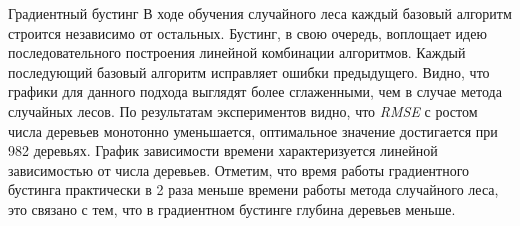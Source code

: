 \documentclass[12pt]{article}
\begin{document}
\begin{section}{Градиентный бустинг}
В ходе обучения случайного леса каждый базовый алгоритм строится независимо от остальных. Бустинг, в свою очередь, воплощает идею последовательного построения линейной комбинации алгоритмов. Каждый последующий базовый алгоритм исправляет ошибки предыдущего. Видно, что графики для данного подхода выглядят более сглаженными, чем в случае метода случайных лесов. По результатам экспериментов видно, что \emph{RMSE} с ростом числа деревьев монотонно уменьшается, оптимальное значение достигается при 982 деревьях. График зависимости времени характеризуется линейной зависимостью от числа деревьев. Отметим, что время работы градиентного бустинга практически в 2 раза меньше времени работы метода случайного леса, это связано с тем, что в градиентном бустинге глубина деревьев меньше. 

\begin{figure}[h!]
\begin{minipage}[h]{0.5\linewidth}
\end{minipage}
\hfill
\begin{minipage}[h]{0.5\linewidth}

\end{minipage}
\end{figure}
\end{section}
\end{document}
